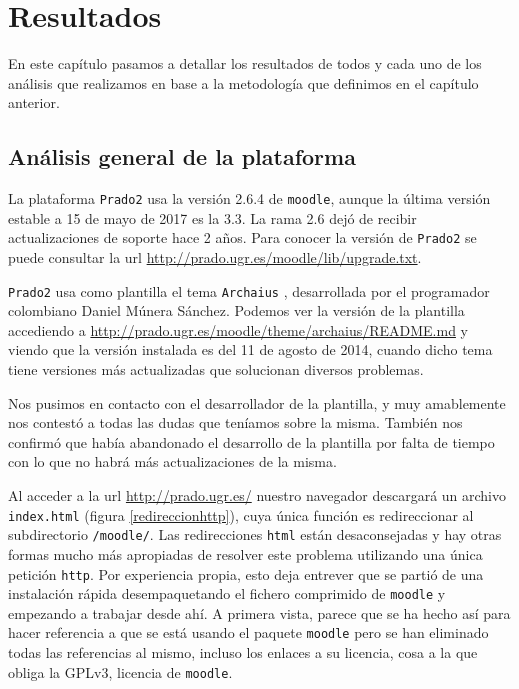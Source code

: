 \chapter{Resultados}

En este capítulo pasamos a detallar los resultados de todos y cada uno de los análisis que realizamos en base a la metodología que definimos en el capítulo anterior.

\section{Análisis general de la plataforma}

La plataforma \texttt{Prado2} usa la versión 2.6.4 de \texttt{moodle}, aunque la última versión estable a 15 de mayo de 2017 es la 3.3. La rama 2.6 dejó de recibir actualizaciones de soporte hace 2 años. Para conocer la versión de \texttt{Prado2} se puede consultar la url \url{http://prado.ugr.es/moodle/lib/upgrade.txt}.

\bigskip
\texttt{Prado2} usa como plantilla el tema \texttt{Archaius} \cite{moodletheme}, desarrollada por el programador colombiano Daniel Múnera Sánchez. Podemos ver la versión de la plantilla accediendo a \url{http://prado.ugr.es/moodle/theme/archaius/README.md} y viendo que la versión instalada es del 11 de agosto de 2014, cuando dicho tema tiene versiones más actualizadas que solucionan diversos problemas.

\bigskip
Nos pusimos en contacto con el desarrollador de la plantilla, y muy amablemente nos contestó a todas las dudas que teníamos sobre la misma. También nos confirmó que había abandonado el desarrollo de la plantilla por falta de tiempo con lo que no habrá más actualizaciones de la misma.

\bigskip
Al acceder a la url \url{http://prado.ugr.es/} nuestro navegador descargará un archivo \texttt{index.html} (figura \ref{redireccionhttp}), cuya única función es redireccionar al subdirectorio \texttt{/moodle/}. Las redirecciones \texttt{html} están desaconsejadas y hay otras formas mucho más apropiadas de resolver este problema utilizando una única petición \texttt{http}. Por experiencia propia, esto deja entrever que se partió de una instalación rápida desempaquetando el fichero comprimido de \texttt{moodle} y empezando a trabajar desde ahí. A primera vista, parece que se ha hecho así para hacer referencia a que se está usando el paquete \texttt{moodle} pero se han eliminado todas las referencias al mismo, incluso los enlaces a su licencia, cosa a la que obliga la GPLv3, licencia de \texttt{moodle}.

